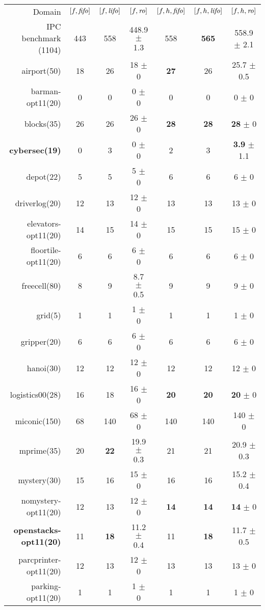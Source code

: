 \begin{center}
\begin{tabular}{|r|*{2}{ccc|}}
Domain & \([f,{\text{\textit{fifo}}}]\) & \([f,{\text{\textit{lifo}}}]\) & \([f,{\text{\textit{ro}}}]\) & \([f,h,{\text{\textit{fifo}}}]\) & \([f,h,{\text{\textit{lifo}}}]\) & \([f,h,{\text{\textit{ro}}}]\)\\
IPC benchmark (1104) & 443 & 558 & 448.9 \(\pm\) 1.3 & 558 & \textbf{565} & 558.9 \(\pm\) 2.1\\
airport(50) & 18 & 26 & 18 \(\pm\) 0 & \textbf{27} & 26 & 25.7 \(\pm\) 0.5\\
barman-opt11(20) & 0 & 0 & 0 \(\pm\) 0 & 0 & 0 & 0 \(\pm\) 0\\
blocks(35) & 26 & 26 & 26 \(\pm\) 0 & \textbf{28} & \textbf{28} & \textbf{28} \(\pm\) 0\\
\textbf{cybersec(19)} & 0 & 3 & 0 \(\pm\) 0 & 2 & 3 & \textbf{3.9} \(\pm\) 1.1\\
depot(22) & 5 & 5 & 5 \(\pm\) 0 & 6 & 6 & 6 \(\pm\) 0\\
driverlog(20) & 12 & 13 & 12 \(\pm\) 0 & 13 & 13 & 13 \(\pm\) 0\\
elevators-opt11(20) & 14 & 15 & 14 \(\pm\) 0 & 15 & 15 & 15 \(\pm\) 0\\
floortile-opt11(20) & 6 & 6 & 6 \(\pm\) 0 & 6 & 6 & 6 \(\pm\) 0\\
freecell(80) & 8 & 9 & 8.7 \(\pm\) 0.5 & 9 & 9 & 9 \(\pm\) 0\\
grid(5) & 1 & 1 & 1 \(\pm\) 0 & 1 & 1 & 1 \(\pm\) 0\\
gripper(20) & 6 & 6 & 6 \(\pm\) 0 & 6 & 6 & 6 \(\pm\) 0\\
hanoi(30) & 12 & 12 & 12 \(\pm\) 0 & 12 & 12 & 12 \(\pm\) 0\\
logistics00(28) & 16 & 18 & 16 \(\pm\) 0 & \textbf{20} & \textbf{20} & \textbf{20} \(\pm\) 0\\
miconic(150) & 68 & 140 & 68 \(\pm\) 0 & 140 & 140 & 140 \(\pm\) 0\\
mprime(35) & 20 & \textbf{22} & 19.9 \(\pm\) 0.3 & 21 & 21 & 20.9 \(\pm\) 0.3\\
mystery(30) & 15 & 16 & 15 \(\pm\) 0 & 16 & 16 & 15.2 \(\pm\) 0.4\\
nomystery-opt11(20) & 12 & 13 & 12 \(\pm\) 0 & \textbf{14} & \textbf{14} & \textbf{14} \(\pm\) 0\\
\textbf{openstacks-opt11(20)} & 11 & \textbf{18} & 11.2 \(\pm\) 0.4 & 11 & \textbf{18} & 11.7 \(\pm\) 0.5\\
parcprinter-opt11(20) & 12 & 13 & 12 \(\pm\) 0 & 13 & 13 & 13 \(\pm\) 0\\
parking-opt11(20) & 1 & 1 & 1 \(\pm\) 0 & 1 & 1 & 1 \(\pm\) 0\\

\end{tabular}
\end{center}
